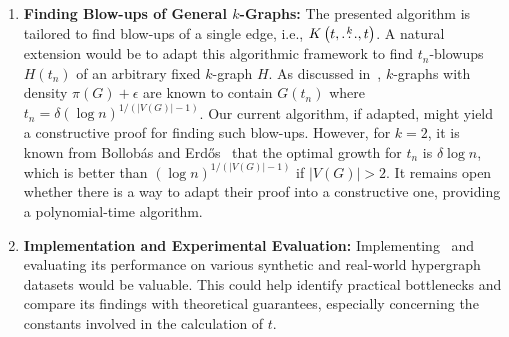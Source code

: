 \begin{enumerate}
    \item \textbf{Finding Blow-ups of General $k$-Graphs:}
    The presented algorithm is tailored to find blow-ups of a single edge, i.e., $K\left(t, \overset{k}{\dots}, t\right)$.
    A natural extension would be to adapt this algorithmic framework to find $t_n$-blowups $H(t_n)$ of an arbitrary fixed $k$-graph $H$.
    As discussed in~, $k$-graphs with density $\pi(G) + \epsilon$
    are known to contain $G(t_n)$ where $t_n = \delta (\log n)^{1/(|V(G)|-1)}$.
    Our current algorithm, if adapted, might yield a constructive proof for finding such blow-ups.
    However, for $k=2$, it is known from Bollobás and Erd\H{o}s~\cite{bollobas1973structure} that the optimal growth for $t_n$
    is $\delta \log n$, which is better than $(\log n)^{1/(|V(G)|-1)}$ if $|V(G)| > 2$.
    It remains open whether there is a way to adapt their proof into a constructive one,
    providing a polynomial-time algorithm.


    \item \textbf{Implementation and Experimental Evaluation:}
    Implementing~
    and evaluating its performance on various synthetic and real-world hypergraph datasets would be valuable.
    This could help identify practical bottlenecks and compare its findings with theoretical guarantees,
    especially concerning the constants involved in the calculation of $t$.
\end{enumerate}
